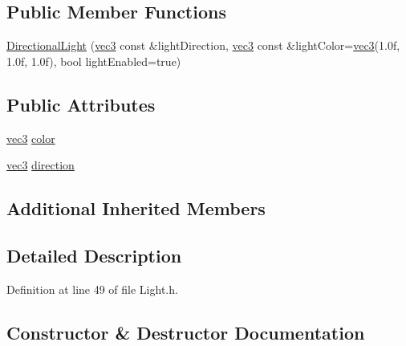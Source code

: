 \subsection*{Public Member Functions}
\begin{DoxyCompactItemize}
\item 
\hyperlink{struct_directional_light_ac2b1a62d9ad6395b2f453b4544127bf1}{Directional\+Light} (\hyperlink{_types_8h_a3d0ce73e3199de81565fb01632415288}{vec3} const \&light\+Direction, \hyperlink{_types_8h_a3d0ce73e3199de81565fb01632415288}{vec3} const \&light\+Color=\hyperlink{_types_8h_a3d0ce73e3199de81565fb01632415288}{vec3}(1.\+0f, 1.\+0f, 1.\+0f), bool light\+Enabled=true)
\end{DoxyCompactItemize}
\subsection*{Public Attributes}
\begin{DoxyCompactItemize}
\item 
\hyperlink{_types_8h_a3d0ce73e3199de81565fb01632415288}{vec3} \hyperlink{struct_directional_light_a0fff081764e57e46c7342fc6c6849c1c}{color}
\item 
\hyperlink{_types_8h_a3d0ce73e3199de81565fb01632415288}{vec3} \hyperlink{struct_directional_light_a78a56aede026b50aa2606bf20c1b0871}{direction}
\end{DoxyCompactItemize}
\subsection*{Additional Inherited Members}


\subsection{Detailed Description}


Definition at line 49 of file Light.\+h.



\subsection{Constructor \& Destructor Documentation}
